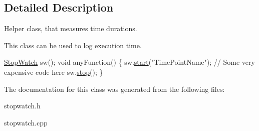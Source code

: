 \subsection{Detailed Description}
Helper class, that measures time durations. 

This class can be used to log execution time.


\begin{DoxyCode}
\hyperlink{group__Tools_ga086b4f40c93978f661d5154f31081677}{StopWatch} sw();
\textcolor{keywordtype}{void} anyFunction()
\{
   sw.\hyperlink{group__Tools_ga0171f821750460729b49db731d20e214}{start}(\textcolor{stringliteral}{"TimePointName"});
   \textcolor{comment}{// Some very expensive code here}
   sw.\hyperlink{group__Tools_ga2b770511bceacff939c8bbf69e25445f}{stop}();
\}
\end{DoxyCode}
 

The documentation for this class was generated from the following files\-:\begin{DoxyCompactItemize}
\item 
stopwatch.\-h\item 
stopwatch.\-cpp\end{DoxyCompactItemize}
